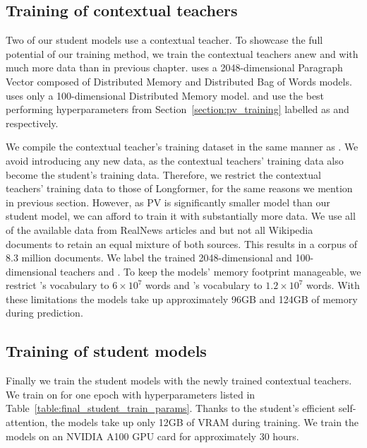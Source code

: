 \subsection{Training of contextual teachers}

Two of our student models use a contextual teacher. To showcase the full
potential of our training method, we train the contextual teachers anew and
with much more data than in previous chapter. {\CosineStudent} uses a
2048-dimensional Paragraph Vector \citep{le2014distributed} composed of
Distributed Memory and Distributed Bag of Words models. {\MSEStudent} uses only
a 100-dimensional Distributed Memory model. {\CosineStudent} and {\MSEStudent}
use the best performing hyperparameters from Section~\ref{section:pv_training}
labelled as  and  respectively.

We compile the contextual teacher's training dataset in the same manner as
. We avoid introducing any new data, as the contextual
teachers' training data also become the student's training data. Therefore, we
restrict the contextual teachers' training data to those of Longformer, for the
same reasons we mention in previous section. However, as PV is significantly
smaller model than our student model, we can afford to train it with
substantially more data. We use all of the available data from RealNews
articles and but not all Wikipedia documents to retain an equal mixture of both
sources. This results in a corpus of 8.3 million documents. We label the
trained 2048-dimensional and 100-dimensional teachers  and
. To keep the models' memory footprint manageable, we restrict
's vocabulary to $6\times 10^7$ words and 's vocabulary to
$1.2\times 10^7$ words. With these limitations the models take up approximately
96GB and 124GB of memory during prediction.

\subsection{Training of student models}

Finally we train the student models with the newly trained contextual teachers.
We train on  for one epoch with hyperparameters listed in
Table~\ref{table:final_student_train_params}. Thanks to the student's efficient
self-attention, the models take up only 12GB of VRAM during training. We train
the models on an NVIDIA A100 GPU card for approximately 30 hours.

